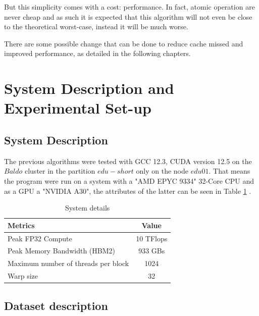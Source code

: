 \documentclass[conference]{IEEEtran}
\begin{document}
But this simplicity comes with a cost: performance. In fact, atomic operation are never cheap and as such it is expected that this algorithm will not even be close to the theoretical worst-case, instead it will be much worse.

There are some possible change that can be done to reduce cache missed and improved performance, as detailed in the following chapters.

\section{System Description and Experimental Set-up}

\subsection{System Description}
The previous algorithms were tested with GCC 12.3, CUDA version 12.5 on the $Baldo$ cluster in the partition $edu-short$ only on the node $edu01$. That means the program were run on a system with a "AMD EPYC 9334" 32-Core CPU and as a GPU a "NVIDIA A30", the attributes of the latter can be seen in Table \ref{tab:system_description} .

\begin{table}[htb!]
	\centering
	\begin{adjustbox}{width=0.8\columnwidth}
		\begin{tabular}{lc}
			\toprule
			\textbf{Metrics} &  \textbf{Value}  \\
			\midrule
			Peak FP32 Compute &  10 TFlops   \\
			Peak Memory Bandwidth (HBM2) & 933 GBs  \\
			Maximum number of threads per block & 1024 \\
			Warp size & 32 \\
			\bottomrule
		\end{tabular}
	\end{adjustbox}
	\vspace{1em}

	\caption{System details}
	\label{tab:system_description}
\end{table}

\subsection{Dataset description}
\end{document}
